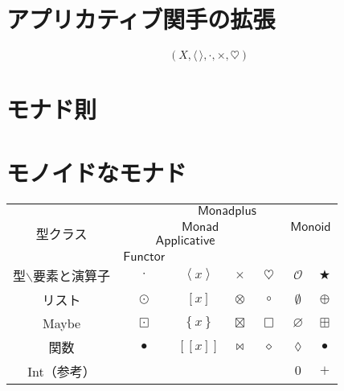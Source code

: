 \documentclass[twocolumn]{jsbook}
\def\[{[\![}
\def\]{]\!]}
\newcommand{\hsklTypeclass}[1]{\mathsf{#1}}
\newcommand{\hsklApplicative}{\hsklTypeclass{Applicative}}
\newcommand{\hsklFunctor}{\hsklTypeclass{Functor}}
\newcommand{\hsklMonad}{\hsklTypeclass{Monad}}
\newcommand{\hsklMonadplus}{\hsklTypeclass{Monadplus}}
\newcommand{\hsklMonoid}{\hsklTypeclass{Monoid}}
\newcommand{\anonymousparameter}{\lozenge}
\newcommand{\constantempty}{\emptyset}
\newcommand{\constantnothing}{\varnothing}
\newcommand{\binaryadd}{+}
\newcommand{\binarycompose}{\bullet}
\newcommand{\binaryfunctormap}{\cdot}
\newcommand{\binaryapplicativemap}{\times}
\newcommand{\binarymonadmap}{\heartsuit}%
\newcommand{\binarylistfunctormap}{\odot}
\newcommand{\binarylistapplicativemap}{\otimes}
\newcommand{\binarylistmonadmap}{\circ}%
\newcommand{\binarylistappend}{\oplus}
\newcommand{\binarymaybefunctormap}{\boxdot}
\newcommand{\binarymaybeapplicativemap}{\boxtimes}
\newcommand{\binarymaybemonadmap}{\Box}%
\newcommand{\binarymaybeappend}{\boxplus}
\newcommand{\binaryfunctionfunctormap}{\binarycompose}
\newcommand{\binaryfunctionapplicativemap}{\Join}%
\newcommand{\binaryfunctionmonadmap}{\diamond}%
\newcommand{\applicativetype}[1]{\left\langle#1\right\rangle}
\newcommand{\listtype}[1]{\left[#1\right]}
\newcommand{\maybetype}[1]{\left\{#1\right\}}
\newcommand{\functyontype}[1]{\[#1\]}
\newcommand{\mathbinaryop}{\bigstar}
\newcommand{\mathidentity}{\mathcal{O}}
\begin{document}
\section{アプリカティブ関手の拡張}

$$(X,\langle\,\rangle,\binaryfunctormap,\times,\heartsuit)$$


\section{モナド則}

\section{モノイドなモナド}


\begin{table*}
\begin{center}
\begin{tabular}{||c||c|c|c|c|c|c||}
\hline
\multirow{4}{*}{型クラス}
    &\multicolumn{6}{|c||}{$\hsklMonadplus$}\\
\cline{2-7}
\multirow{3}{*}{}
    &\multicolumn{4}{|c|}{$\hsklMonad$}
    &\multicolumn{2}{|c||}{$\hsklMonoid$}\\
\cline{2-4}
\multirow{2}{*}{}
    &\multicolumn{3}{|c|}{$\hsklApplicative$}
    &
    &\multicolumn{2}{|c||}{ }\\
\cline{2-2}
{ }
    &\multicolumn{1}{|c|}{$\hsklFunctor$}
    &\multicolumn{2}{|c|}{ }
    &
    &\multicolumn{2}{|c||}{ }\\
\hline\hline
型$\backslash$要素と演算子
    &$\binaryfunctormap$
    &$\applicativetype{x}$
    &$\binaryapplicativemap$
    &$\binarymonadmap$
    &$\mathidentity$
    &$\mathbinaryop$\\
\hline
リスト
    &$\binarylistfunctormap$
    &$\listtype{x}$
    &$\binarylistapplicativemap$
    &$\binarylistmonadmap$
    &$\constantempty$
    &$\binarylistappend$\\
\hline
Maybe
    &$\binarymaybefunctormap$
    &$\maybetype{x}$
    &$\binarymaybeapplicativemap$
    &$\binarymaybemonadmap$
    &$\constantnothing$
    &$\binarymaybeappend$\\
\hline
関数
    &$\binaryfunctionfunctormap$
    &$\functyontype{x}$
    &$\binaryfunctionapplicativemap$
    &$\binaryfunctionmonadmap$
    &$\anonymousparameter$
    &$\binarycompose$\\
\hline
Int（参考）
    &
    &
    &
    &
    &$0$
    &$\binaryadd$\\
\hline
\end{tabular}
\end{center}
\end{table*}
\end{document}
